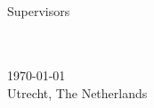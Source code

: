 \begin{titlepage}
    \begin{addmargin}[-1cm]{-3cm}
    \begin{center}
        \large

        \hfill

        \vfill

        \begingroup
            \color{Maroon}\spacedallcaps{\myTitle} \\ \medskip
        \endgroup
        

        \spacedlowsmallcaps{\myName}

        \vfill

        
        Supervisors \\ \medskip
        \myProf \\
        \myOtherProf \\ \medskip

        \vfill
		
		{\footnotesize \today} \\
		{\footnotesize Utrecht, The Netherlands}
    \end{center}
  \end{addmargin}
\end{titlepage}